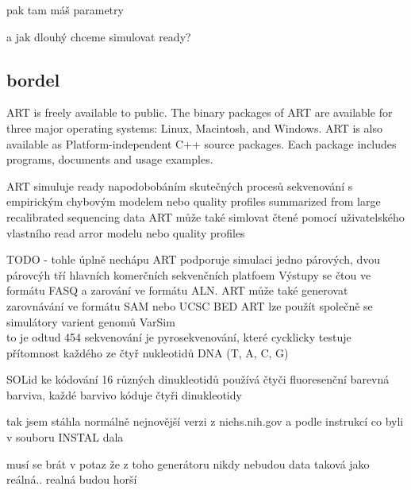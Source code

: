 \documentclass[czech,DP]{thesiskiv}
\numberwithin{equation}{section}
\begin{document}
pak tam máš parametry 

a jak dlouhý chceme simulovat ready? 



\subsection{bordel}
ART is freely available to public. The binary packages of ART are available for three major operating systems: Linux, Macintosh, and Windows. ART is also available as Platform-independent C++ source packages. Each package includes programs, documents and usage examples.

ART simuluje ready napodobobáním skutečných procesů sekvenování s empirickým chybovým modelem nebo quality profiles summarized from large recalibrated sequencing data
ART může také simlovat čtené pomocí uživatelského vlastního read arror modelu nebo quality profiles

TODO - tohle úplně nechápu ART podporuje simulaci jedno párových, dvou párovcýh tří hlavních komerčních sekvenčních platfoem 
Výstupy se čtou ve formátu FASQ a zarování ve formátu ALN. 
ART může také generovat zarovnávání ve formátu SAM nebo UCSC BED
ART lze použít společně se simulátory varient genomů VarSim 
\\
to je odtud %
454 sekvenování je pyrosekvenování, které cycklicky testuje přítomnost každého ze čtyř nukleotidů DNA (T, A, C, G)

SOLid ke kódování 16 různých dinukleotidů používá čtyči fluoresenční barevná barviva, každé barvivo kóduje čtyři dinukleotidy
 


tak jsem stáhla normálně nejnovější verzi z niehs.nih.gov a podle instrukcí co byli v souboru INSTAL dala %


musí se brát v potaz že z toho generátoru nikdy nebudou data taková jako reálná.. realná budou horší 
\end{document}
